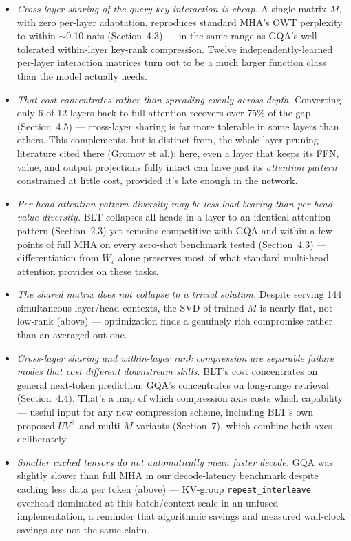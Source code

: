 \documentclass[11pt]{article}
\begin{document}
\begin{itemize}
\item \emph{Cross-layer sharing of the query-key interaction is cheap.} A single matrix $M$, with zero per-layer adaptation, reproduces standard MHA's OWT perplexity to within $\sim$0.10 nats (Section~4.3) --- in the same range as GQA's well-tolerated within-layer key-rank compression. Twelve independently-learned per-layer interaction matrices turn out to be a much larger function class than the model actually needs.
\item \emph{That cost concentrates rather than spreading evenly across depth.} Converting only 6 of 12 layers back to full attention recovers over 75\% of the gap (Section~4.5) --- cross-layer sharing is far more tolerable in some layers than others. This complements, but is distinct from, the whole-layer-pruning literature cited there (Gromov et al.): here, even a layer that keeps its FFN, value, and output projections fully intact can have just its \emph{attention pattern} constrained at little cost, provided it's late enough in the network.
\item \emph{Per-head attention-pattern diversity may be less load-bearing than per-head value diversity.} BLT collapses all heads in a layer to an identical attention pattern (Section~2.3) yet remains competitive with GQA and within a few points of full MHA on every zero-shot benchmark tested (Section~4.3) --- differentiation from $W_v$ alone preserves most of what standard multi-head attention provides on these tasks.
\item \emph{The shared matrix does not collapse to a trivial solution.} Despite serving 144 simultaneous layer/head contexts, the SVD of trained $M$ is nearly flat, not low-rank (above) --- optimization finds a genuinely rich compromise rather than an averaged-out one.
\item \emph{Cross-layer sharing and within-layer rank compression are separable failure modes that cost different downstream skills.} BLT's cost concentrates on general next-token prediction; GQA's concentrates on long-range retrieval (Section~4.4). That's a map of which compression axis costs which capability --- useful input for any new compression scheme, including BLT's own proposed $UV^\top$ and multi-$M$ variants (Section~7), which combine both axes deliberately.
\item \emph{Smaller cached tensors do not automatically mean faster decode.} GQA was slightly slower than full MHA in our decode-latency benchmark despite caching less data per token (above) --- KV-group \texttt{repeat\_interleave} overhead dominated at this batch/context scale in an unfused implementation, a reminder that algorithmic savings and measured wall-clock savings are not the same claim.
\end{itemize}
\end{document}
